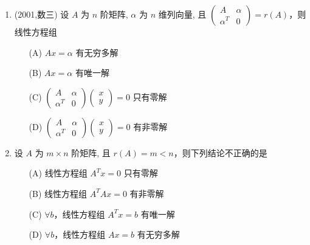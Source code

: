 \documentclass[12pt, a4paper, oneside, UTF8]{ctexbook}
\begin{document}
\begin{enumerate}
    \item (2001,数三) 设 $A$ 为 $n$ 阶矩阵, $\alpha$ 为 $n$ 维列向量, 且 $\begin{pmatrix} A & \alpha \\ \alpha^T & 0 \end{pmatrix} = r(A)$，则线性方程组
    \begin{enumerate}
        \item [(A)] $Ax = \alpha$ 有无穷多解
        \item [(B)] $Ax = \alpha$ 有唯一解
        \item [(C)] $\begin{pmatrix} A & \alpha \\ \alpha^T & 0 \end{pmatrix} \begin{pmatrix} x \\ y \end{pmatrix} = 0$ 只有零解
        \item [(D)] $\begin{pmatrix} A & \alpha \\ \alpha^T & 0 \end{pmatrix} \begin{pmatrix} x \\ y \end{pmatrix} = 0$ 有非零解
    \end{enumerate}
    
    \begin{solution}
    \newpage
    \end{solution}
    
    \item 设 $A$ 为 $m \times n$ 阶矩阵, 且 $r(A) = m < n$，则下列结论不正确的是
    \begin{enumerate}
        \item [(A)] 线性方程组 $A^T x = 0$ 只有零解
        \item [(B)] 线性方程组 $A^T A x = 0$ 有非零解
        \item [(C)] $\forall b$，线性方程组 $A^T x = b$ 有唯一解
        \item [(D)] $\forall b$，线性方程组 $A x = b$ 有无穷多解
    \end{enumerate}
    
    \begin{solution}
    \newpage
    \end{solution}
\end{enumerate}
\end{document}
